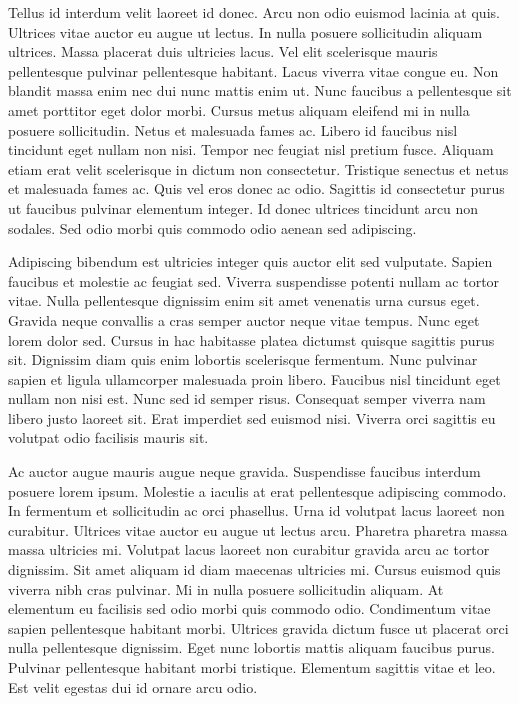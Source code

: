 Tellus id interdum velit laoreet id donec. Arcu non odio euismod 
lacinia at quis. Ultrices vitae auctor eu augue ut lectus. In nulla 
posuere sollicitudin aliquam ultrices. Massa placerat duis ultricies 
lacus. Vel elit scelerisque mauris pellentesque pulvinar pellentesque 
habitant. Lacus viverra vitae congue eu. Non blandit massa enim nec dui 
nunc mattis enim ut. Nunc faucibus a pellentesque sit amet porttitor 
eget dolor morbi. Cursus metus aliquam eleifend mi in nulla posuere 
sollicitudin. Netus et malesuada fames ac. Libero id faucibus nisl 
tincidunt eget nullam non nisi. Tempor nec feugiat nisl pretium fusce. 
Aliquam etiam erat velit scelerisque in dictum non consectetur. 
Tristique senectus et netus et malesuada fames ac. Quis vel eros donec 
ac odio. Sagittis id consectetur purus ut faucibus pulvinar elementum 
integer. Id donec ultrices tincidunt arcu non sodales. Sed odio morbi 
quis commodo odio aenean sed adipiscing.


Adipiscing bibendum est ultricies integer quis auctor elit sed 
vulputate. Sapien faucibus et molestie ac feugiat sed. Viverra 
suspendisse potenti nullam ac tortor vitae. Nulla pellentesque dignissim
 enim sit amet venenatis urna cursus eget. Gravida neque convallis a 
cras semper auctor neque vitae tempus. Nunc eget lorem dolor sed. Cursus
 in hac habitasse platea dictumst quisque sagittis purus sit. Dignissim 
diam quis enim lobortis scelerisque fermentum. Nunc pulvinar sapien et 
ligula ullamcorper malesuada proin libero. Faucibus nisl tincidunt eget 
nullam non nisi est. Nunc sed id semper risus. Consequat semper viverra 
nam libero justo laoreet sit. Erat imperdiet sed euismod nisi. Viverra 
orci sagittis eu volutpat odio facilisis mauris sit.


Ac auctor augue mauris augue neque gravida. Suspendisse faucibus 
interdum posuere lorem ipsum. Molestie a iaculis at erat pellentesque 
adipiscing commodo. In fermentum et sollicitudin ac orci phasellus. Urna
 id volutpat lacus laoreet non curabitur. Ultrices vitae auctor eu augue
 ut lectus arcu. Pharetra pharetra massa massa ultricies mi. Volutpat 
lacus laoreet non curabitur gravida arcu ac tortor dignissim. Sit amet 
aliquam id diam maecenas ultricies mi. Cursus euismod quis viverra nibh 
cras pulvinar. Mi in nulla posuere sollicitudin aliquam. At elementum eu
 facilisis sed odio morbi quis commodo odio. Condimentum vitae sapien 
pellentesque habitant morbi. Ultrices gravida dictum fusce ut placerat 
orci nulla pellentesque dignissim. Eget nunc lobortis mattis aliquam 
faucibus purus. Pulvinar pellentesque habitant morbi tristique. 
Elementum sagittis vitae et leo. Est velit egestas dui id ornare arcu 
odio.



